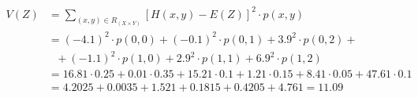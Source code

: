 \documentclass[11pt]{article}
\begin{document}
\begin{align*}
    V(Z) &= \sum_{(x,y) \in R_{(X \times Y)}} [H(x,y) - E(Z)]^2 \cdot p(x,y) \\
         &= (-4.1)^2 \cdot p(0,0) + (-0.1)^2 \cdot p(0,1) + 3.9^2 \cdot p(0,2) + \\ &\ \ \ + (-1.1)^2 \cdot p(1,0) + 2.9^2 \cdot p(1,1) + 6.9^2 \cdot p(1,2) \\
         &= 16.81 \cdot 0.25 + 0.01 \cdot 0.35 + 15.21 \cdot 0.1 + 1.21 \cdot 0.15 + 8.41 \cdot 0.05 + 47.61 \cdot 0.1 \\
         &= 4.2025 + 0.0035 + 1.521 + 0.1815 + 0.4205 + 4.761 = 11.09
\end{align*}
\end{document}
